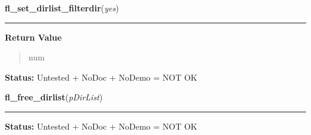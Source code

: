     \label{xformslib:library:fl_set_dirlist_filterdir}

    \vspace{0.5ex}

\hspace{.8\funcindent}\begin{boxedminipage}{\funcwidth}

    \raggedright \textbf{fl\_set\_dirlist\_filterdir}(\textit{yes})

    \vspace{-1.5ex}

    \rule{\textwidth}{0.5\fboxrule}
\setlength{\parskip}{2ex}
\setlength{\parskip}{1ex}
      \textbf{Return Value}
    \vspace{-1ex}

      \begin{quote}
      num

      \end{quote}

\textbf{Status:} Untested + NoDoc + NoDemo = NOT OK



    \end{boxedminipage}

    \label{xformslib:library:fl_free_dirlist}

    \vspace{0.5ex}

\hspace{.8\funcindent}\begin{boxedminipage}{\funcwidth}

    \raggedright \textbf{fl\_free\_dirlist}(\textit{pDirList})

    \vspace{-1.5ex}

    \rule{\textwidth}{0.5\fboxrule}
\setlength{\parskip}{2ex}
\setlength{\parskip}{1ex}
\textbf{Status:} Untested + NoDoc + NoDemo = NOT OK



    \end{boxedminipage}

    \label{xformslib:library:fl_free_all_dirlist}

